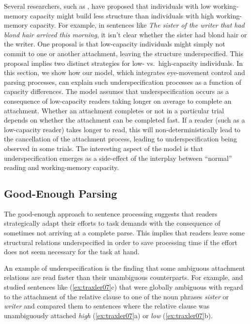 \documentclass{cambridge7A}\usepackage[]{graphicx}\usepackage[]{color}
\begin{document}
Several researchers, such as \cite{Traxler2007}, have proposed that individuals with low working-memory capacity might build less structure than individuals with high working-memory capacity. For example, in sentences like \textit{The sister of the writer that had blond hair arrived this morning}, it isn't clear whether the sister had blond hair or the writer. One proposal is that low-capacity individuals might simply not commit to one or another attachment, leaving the structure underspecified. This proposal implies two distinct strategies for low- vs.\ high-capacity individuals. In this section, we show how our model, which integrates eye-movement control and parsing processes, can explain such underspecification processes as a function of capacity differences. The model assumes that underspecification occurs as a consequence of low-capacity readers taking longer on average to complete an attachment. Whether an attachment completes or not in a particular trial depends on whether the attachment can be completed fast. If a reader (such as a low-capacity reader) takes longer to read, this will non-deterministically lead to the cancellation of the attachment process, leading to underspecification being observed in some trials. The interesting aspect of the model is that underspecification emerges as a side-effect of the interplay between ``normal'' reading and working-memory capacity. 

\subsection{Good-Enough Parsing}
The good-enough approach to sentence processing \citep{FerreiraFerraroBailey2002,SanfordSturt2002} suggests that readers strategically adapt their efforts to task demands with the consequence of sometimes not arriving at a complete parse. 
This implies that readers leave some structural relations underspecified in order to save processing time if the effort does not seem necessary for the task at hand.

An example of underspecification is the finding that some ambiguous attachment relations are read faster than their unambiguous counterparts. For example, \cite{TraxlerPickeringClifton1998} and \cite{Traxler2007} studied sentences like (\ref{ex:traxler07}c) that were globally ambiguous with regard to the attachment of the relative clause to one of the noun phrases \textit{sister} or \textit{writer} and compared them to sentences where the relative clause was unambiguously attached \emph{high} (\ref{ex:traxler07}a) or \emph{low} (\ref{ex:traxler07}b).
\end{document}
